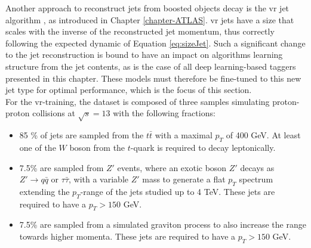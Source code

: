 Another approach to reconstruct jets from boosted objects decay is the \gls{vr} jet algorithm \cite{vrJetPaper}, as introduced in Chapter \ref{chapter-ATLAS}. \gls{vr} jets have a size that scales with the inverse of the reconstructed jet momentum, thus correctly following the expected dynamic of Equation \ref{eq:sizeJet}. Such a significant change to the jet reconstruction is bound to have an impact on algorithms learning structure from the jet contents, as is the case of all deep learning-based taggers presented in this chapter. These models must therefore be fine-tuned to this new jet type for optimal performance, which is the focus of this section. \\  %

For the \gls{vr}-training, the dataset is composed of three samples simulating proton-proton collisions at $\sqrt{s} = 13$ with the following fractions:
\begin{itemize}
  \item 85 \% of jets are sampled from the $t\bar{t}$ with a maximal $p_T$ of 400 GeV. At least one of the $W$ boson from the $t$-quark is required to decay leptonically.
  \item 7.5\% are sampled from $Z'$ events, where an exotic boson $Z'$ decays as $Z' \rightarrow q\bar{q} \textrm{ or } \tau \bar{\tau}$, with a variable $Z'$ mass to generate a flat $p_T$ spectrum extending the $p_T$-range of the jets studied up to 4 TeV. These jets are required to have a $p_T > 150$ GeV.
  \item 7.5\% are sampled from a simulated graviton process to also increase the range towards higher momenta. These jets are required to have a $p_T > 150$ GeV.
\end{itemize}

